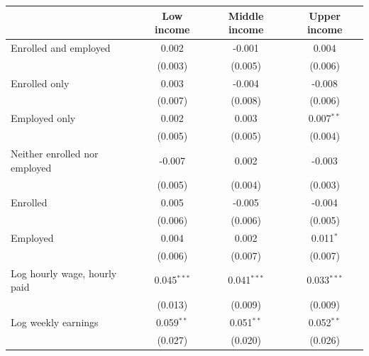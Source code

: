 \begin{tabular}{lccc}
\toprule
 & Low income & Middle income & Upper income \\
\midrule
Enrolled and employed & 0.002 & -0.001 & 0.004 \\
 & (0.003) & (0.005) & (0.006) \\
Enrolled only & 0.003 & -0.004 & -0.008 \\
 & (0.007) & (0.008) & (0.006) \\
Employed only & 0.002 & 0.003 & 0.007$^{**}$ \\
 & (0.005) & (0.005) & (0.004) \\
Neither enrolled nor employed & -0.007 & 0.002 & -0.003 \\
 & (0.005) & (0.004) & (0.003) \\
Enrolled & 0.005 & -0.005 & -0.004 \\
 & (0.006) & (0.006) & (0.005) \\
Employed & 0.004 & 0.002 & 0.011$^{*}$ \\
 & (0.006) & (0.007) & (0.007) \\
Log hourly wage, hourly paid & 0.045$^{***}$ & 0.041$^{***}$ & 0.033$^{***}$ \\
 & (0.013) & (0.009) & (0.009) \\
Log weekly earnings & 0.059$^{**}$ & 0.051$^{**}$ & 0.052$^{**}$ \\
 & (0.027) & (0.020) & (0.026) \\
\bottomrule
\end{tabular}
